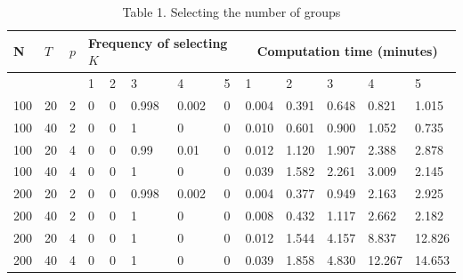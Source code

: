 \documentclass[10pt]{article}
\begin{document}
\begin{table}[h]
\begin{center}
\captionsetup{labelformat=empty}
\caption{Table 1. Selecting the number of groups}
\begin{tabular}{|l|l|l|l|l|l|l|l|l|l|l|l|l|}
\hline
\multirow[b]{2}{*}{N} & \multirow[b]{2}{*}{$T$} & \multirow[b]{2}{*}{$p$} & \multicolumn{5}{|l|}{Frequency of selecting $K$} & \multicolumn{5}{|c|}{Computation time (minutes)} \\
\hline
 &  &  & 1 & 2 & 3 & 4 & 5 & 1 & 2 & 3 & 4 & 5 \\
\hline
100 & 20 & 2 & 0 & 0 & 0.998 & 0.002 & 0 & 0.004 & 0.391 & 0.648 & 0.821 & 1.015 \\
\hline
100 & 40 & 2 & 0 & 0 & 1 & 0 & 0 & 0.010 & 0.601 & 0.900 & 1.052 & 0.735 \\
\hline
100 & 20 & 4 & 0 & 0 & 0.99 & 0.01 & 0 & 0.012 & 1.120 & 1.907 & 2.388 & 2.878 \\
\hline
100 & 40 & 4 & 0 & 0 & 1 & 0 & 0 & 0.039 & 1.582 & 2.261 & 3.009 & 2.145 \\
\hline
200 & 20 & 2 & 0 & 0 & 0.998 & 0.002 & 0 & 0.004 & 0.377 & 0.949 & 2.163 & 2.925 \\
\hline
200 & 40 & 2 & 0 & 0 & 1 & 0 & 0 & 0.008 & 0.432 & 1.117 & 2.662 & 2.182 \\
\hline
200 & 20 & 4 & 0 & 0 & 1 & 0 & 0 & 0.012 & 1.544 & 4.157 & 8.837 & 12.826 \\
\hline
200 & 40 & 4 & 0 & 0 & 1 & 0 & 0 & 0.039 & 1.858 & 4.830 & 12.267 & 14.653 \\
\hline
\end{tabular}
\end{center}
\end{table}
\end{document}
